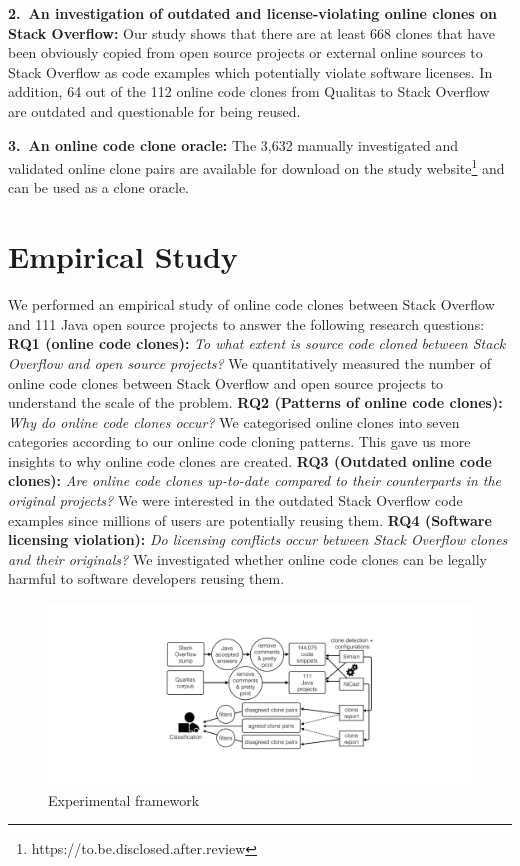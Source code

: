 \documentclass[sigconf,review, anonymous]{acmart}
\begin{document}
\vspace{0.5ex}%
\noindent\textbf{2.~An investigation of outdated and license-violating online clones on Stack Overflow:} Our study shows that there are at least 668 clones that have been obviously copied from open source projects or external online sources to Stack Overflow as code examples which potentially violate software licenses. In addition, 64 out of the 112 online code clones from Qualitas to Stack Overflow are outdated and questionable for being reused.

\vspace{0.5ex}%
\noindent\textbf{3.~An online code clone oracle:} The 3,632 manually investigated and validated online clone pairs are available for download on the study website\footnote{https://to.be.disclosed.after.review} and can be used as a clone oracle.

\section{Empirical Study}
We performed an empirical study of online code clones between Stack Overflow and 111 Java open source projects to answer the following research questions: \\ 
\textbf{RQ1 (online code clones):} \textit{To what extent  is source code cloned between Stack Overflow and open source projects?} We quantitatively measured the number of online code clones between Stack Overflow and open source projects to understand the scale of the problem. \newline
\textbf{RQ2 (Patterns of online code clones):} \textit{Why do online code clones occur?} We categorised online clones into seven categories according to our online code cloning patterns. This gave us more insights to why online code clones are created.
\newline
\textbf{RQ3 (Outdated online code clones):} \textit{Are online code clones up-to-date compared to their counterparts in the original projects?} We were interested in the outdated Stack Overflow code examples since millions of users are potentially reusing them. \newline
\textbf{RQ4 (Software licensing violation):} \textit{Do licensing conflicts occur between Stack Overflow clones and their originals?} We investigated whether online code clones can be legally harmful to software developers reusing them.

\begin{figure}
	\centering
	\includegraphics[width=\linewidth]{exp_framework_new}
	\caption{Experimental framework}
	\label{fig:exp_framework}
\end{figure}
\end{document}
